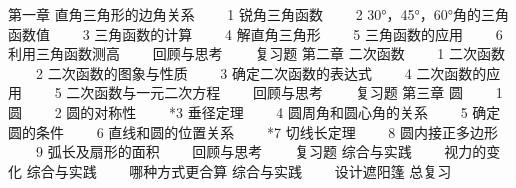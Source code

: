 第一章 直角三角形的边角关系
　　1 锐角三角函数
　　2 30°，45°，60°角的三角函数值
　　3 三角函数的计算
　　4 解直角三角形
　　5 三角函数的应用
　　6 利用三角函数测高
　　回顾与思考
　　复习题
第二章 二次函数
　　1 二次函数
　　2 二次函数的图象与性质
　　3 确定二次函数的表达式
　　4 二次函数的应用
　　5 二次函数与一元二次方程
　　回顾与思考
　　复习题
第三章 圆
　　1 圆
　　2 圆的对称性
　　*3 垂径定理
　　4 圆周角和圆心角的关系
　　5 确定圆的条件
　　6 直线和圆的位置关系
　　*7 切线长定理
　　8 圆内接正多边形
　　9 弧长及扇形的面积
　　回顾与思考
　　复习题
综合与实践
　　视力的变化
综合与实践
　　哪种方式更合算
综合与实践
　　设计遮阳篷
总复习
